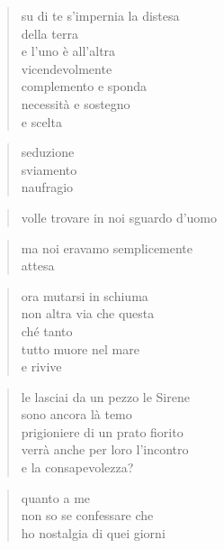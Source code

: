 	\begin{verse}
		su di te s’impernia la distesa\\
		della terra\\
		e l’uno è all’altra\\
		vicendevolmente\\
		complemento e sponda\\
		necessità e sostegno\\
		e scelta
	\end{verse}

\clearpage


\vspace*{2cm}

	\begin{verse}
		seduzione\\
		sviamento\\
		naufragio
	\end{verse}

	\begin{verse}
		volle trovare in noi sguardo d’uomo
	\end{verse}

	\begin{verse}
		ma noi eravamo semplicemente\\
		attesa
	\end{verse}

	\begin{verse}
		ora mutarsi in schiuma\\
		non altra via che questa\\
		ché tanto\\
		tutto muore nel mare\\
		e rivive
	\end{verse}

\clearpage


\vspace*{2cm}

	\begin{verse}
		le lasciai da un pezzo le Sirene\\
		sono ancora là temo\\
		prigioniere di un prato fiorito\\
		verrà anche per loro l’incontro\\
		e la consapevolezza?
	\end{verse}

	\begin{verse}
		quanto a me\\
		non so se confessare che\\
		ho nostalgia di quei giorni
	\end{verse}

